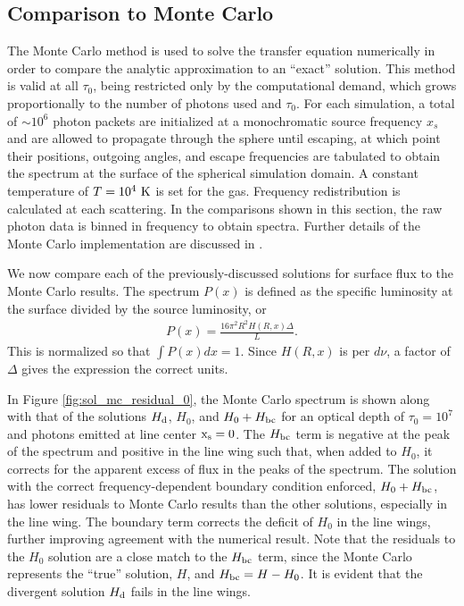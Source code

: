 \documentclass[linenumbers]{aastex63}
\newcommand{\be}{\begin{eqnarray}}
\newcommand{\ee}{\end{eqnarray}}
\begin{document}
\subsection{Comparison to Monte Carlo}
The Monte Carlo method is used to solve the transfer equation numerically in order to compare the analytic approximation to an ``exact'' solution. This method is valid at all $\tau_0$, being restricted only by the computational demand, which grows proportionally to the number of photons used and $\tau_0$. For each simulation, a total of ${\sim}10^6$ photon packets are initialized at a monochromatic source frequency $x_s$ and are allowed to propagate through the sphere until escaping, at which point their positions, outgoing angles, and escape frequencies are tabulated to obtain the spectrum at the surface of the spherical simulation domain. A constant temperature of $T=10^4\ \rm K$ is set for the gas. Frequency redistribution is calculated at each scattering. In the comparisons shown in this section, the raw photon data is binned in frequency to obtain spectra. Further details of the Monte Carlo implementation are discussed in \citet{2017ApJ...851..150H}.

We now compare each of the previously-discussed solutions for surface flux to the Monte Carlo results. The spectrum $P(x)$ is defined as the specific luminosity at the surface divided by the source luminosity, or
\be \label{eq:prob_spectrum}
P(x) = \frac{16\pi^2R^2H(R, x)\Delta}{L}.
\ee
This is normalized so that $\int P(x)dx = 1$. Since $H(R, x)$ is per $d\nu$, a factor of $\Delta$ gives the expression the correct units. 

In Figure \ref{fig:sol_mc_residual_0}, the Monte Carlo spectrum is shown along with that of the solutions $H_{\rm d}$, $H_0$, and $H_0 + H_{\rm bc}$ for an optical depth of $\tau_0 = 10^7$ and photons emitted at line center $\rm x_s = 0$.  The $H_{\rm bc}$ term is negative at the peak of the spectrum and positive in the line wing such that, when added to $H_0$, it corrects for the apparent excess of flux in the peaks of the spectrum. The solution with the correct frequency-dependent boundary condition enforced, $H_0 + H_{\rm bc}$, has lower residuals to Monte Carlo results than the other solutions, especially in the line wing. The boundary term corrects the deficit of $H_0$ in the line wings, further improving agreement with the numerical result. Note that the residuals to the $H_0$ solution are a close match to the $H_{\rm bc}$ term, since the Monte Carlo represents the ``true'' solution, $H$, and $H_{\rm bc} = H - H_0$. It is evident that the divergent solution $H_{\rm d}$ fails in the line wings.
\end{document}
